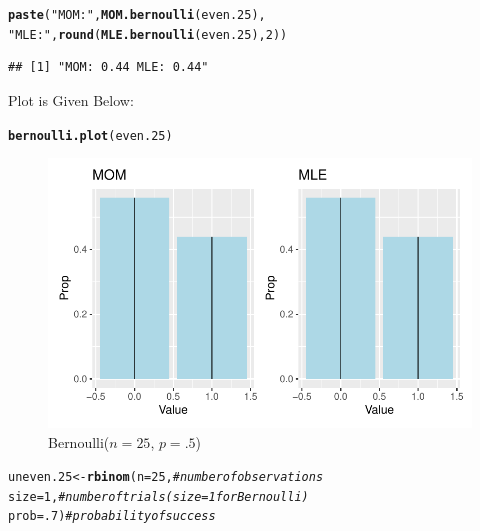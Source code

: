 \documentclass{article}\usepackage[]{graphicx}\usepackage[]{color}
\makeatletter
\def\maxwidth{ %
  \ifdim\Gin@nat@width>\linewidth
    \linewidth
  \else
    \Gin@nat@width
  \fi
}
\newcommand{\hlnum}[1]{\textcolor[rgb]{0.686,0.059,0.569}{#1}}%
\newcommand{\hlstr}[1]{\textcolor[rgb]{0.192,0.494,0.8}{#1}}%
\newcommand{\hlcom}[1]{\textcolor[rgb]{0.678,0.584,0.686}{\textit{#1}}}%
\newcommand{\hlstd}[1]{\textcolor[rgb]{0.345,0.345,0.345}{#1}}%
\newcommand{\hlkwb}[1]{\textcolor[rgb]{0.69,0.353,0.396}{#1}}%
\newcommand{\hlkwc}[1]{\textcolor[rgb]{0.333,0.667,0.333}{#1}}%
\newcommand{\hlkwd}[1]{\textcolor[rgb]{0.737,0.353,0.396}{\textbf{#1}}}%
\newenvironment{kframe}{%
 \def\at@end@of@kframe{}%
 \ifinner\ifhmode%
  \def\at@end@of@kframe{\end{minipage}}%
  \begin{minipage}{\columnwidth}%
 \fi\fi%
 \def\FrameCommand##1{\hskip\@totalleftmargin \hskip-\fboxsep
 \colorbox{shadecolor}{##1}\hskip-\fboxsep
     \hskip-\linewidth \hskip-\@totalleftmargin \hskip\columnwidth}%
 \MakeFramed {\advance\hsize-\width
   \@totalleftmargin\z@ \linewidth\hsize
   \@setminipage}}%
 {\par\unskip\endMakeFramed%
 \at@end@of@kframe}
\newenvironment{knitrout}{}{} %
\makeatother
\begin{document}
\begin{enumerate}
\begin{enumerate}
\begin{knitrout}
\begin{kframe}
\begin{alltt}
\hlkwd{paste}\hlstd{(}\hlstr{"MOM:"}\hlstd{,} \hlkwd{MOM.bernoulli}\hlstd{(even.25),}
      \hlstr{"MLE:"}\hlstd{,} \hlkwd{round}\hlstd{(}\hlkwd{MLE.bernoulli}\hlstd{(even.25),}\hlnum{2}\hlstd{))}
\end{alltt}
\begin{verbatim}
## [1] "MOM: 0.44 MLE: 0.44"
\end{verbatim}
\end{kframe}
\end{knitrout}
Plot is Given Below:
\begin{knitrout}
\color{fgcolor}\begin{kframe}
\begin{alltt}
\hlkwd{bernoulli.plot}\hlstd{(even.25)}
\end{alltt}
\end{kframe}
\end{knitrout}
\begin{figure}[H]
  \begin{center}
\begin{knitrout}
\color{fgcolor}
\includegraphics[width=\maxwidth]{figure/unnamed-chunk-53-1} 
\end{knitrout}
    \caption{Bernoulli($n=25$, $p=.5$)}
    \label{p4plot3}%
  \end{center}
\end{figure}
\begin{knitrout}
\color{fgcolor}\begin{kframe}
\begin{alltt}
\hlstd{uneven.25} \hlkwb{<-} \hlkwd{rbinom}\hlstd{(}\hlkwc{n}\hlstd{=}\hlnum{25}\hlstd{,}        \hlcom{#number of observations}
                    \hlkwc{size}\hlstd{=}\hlnum{1}\hlstd{,}        \hlcom{#number of trials (size=1 for Bernoulli)}
                    \hlkwc{prob}\hlstd{=}\hlnum{.7}\hlstd{)}       \hlcom{#probability of success}


\end{alltt}
\end{kframe}
\end{knitrout}
\end{enumerate}
\end{enumerate}
\end{document}
